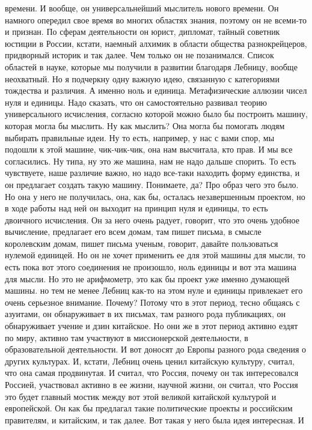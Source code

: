 времени. И вообще, он универсальнейший мыслитель нового времени. Он намного
опередил свое время во многих областях знания, поэтому он не всеми-то и признан.
По сферам деятельности он юрист, дипломат, тайный советник юстиции в России,
кстати, наемный алхимик в области общества разнокрейцеров, придворный историк и
так далее. Чем только он не позанимался. Список областей в науке, которые мы
получили в развитии благодаря Лебницу, вообще неохватный. Но я подчеркну одну
важную идею, связанную с категориями тождества и различия. А именно ноль и
единица. Метафизические аллюзии чисел нуля и единицы. Надо сказать, что он
самостоятельно развивал теорию универсального исчисления, согласно которой можно
было бы построить машину, которая могла бы мыслить. Ну как мыслить? Она могла бы
помогать людям выбирать правильные идеи. Ну то есть, например, у нас с вами
спор, мы подошли к этой машине, чик-чик-чик, она нам высчитала, кто прав. И мы
все согласились. Ну типа, ну это же машина, нам не надо дальше спорить. То есть
чувствуете, наше различие важно, но надо все-таки находить форму единства, и он
предлагает создать такую машину. Понимаете, да? Про образ чего это было. Но она
у него не получилась, она, как бы, осталась незавершенным проектом, но в ходе
работы над ней он выходит на принцип нуля и единицы, то есть двоичного
исчисления. Он за него очень радует, говорит, что это очень удобное вычисление,
предлагает его всем домам, там пишет письма, в смысле королевским домам, пишет
письма ученым, говорит, давайте пользоваться нулемой единицей. Но он не хочет
применить ее для этой машины для мысли, то есть пока вот этого соединения не
произошло, ноль единицы и вот эта машина для мысли. Но это не арифмометр, это
как бы проект уже именно думающей машины. но тем не менее Лебниц как-то на этом
нуле и единицы привлекает его очень серьезное внимание. Почему? Потому что в
этот период, тесно общаясь с азуитами, он обнаруживает в их письмах, там разного
рода публикациях, он обнаруживает учение и дзин китайское. Но они же в этот
период активно ездят по миру, активно там участвуют в миссионерской
деятельности, в образовательной деятельности. И вот доносят до Европы разного
рода сведения о других культурах. И, кстати, Лебниц очень ценил китайскую
культуру, считал, что она самая продвинутая. И считал, что Россия, почему он так
интересовался Россией, участвовал активно в ее жизни, научной жизни, он считал,
что Россия это будет главный мостик между вот этой великой китайской культурой и
европейской. Он как бы предлагал такие политические проекты и российским
правителям, и китайским, и так далее. Вот такая у него была идея интересная. И
